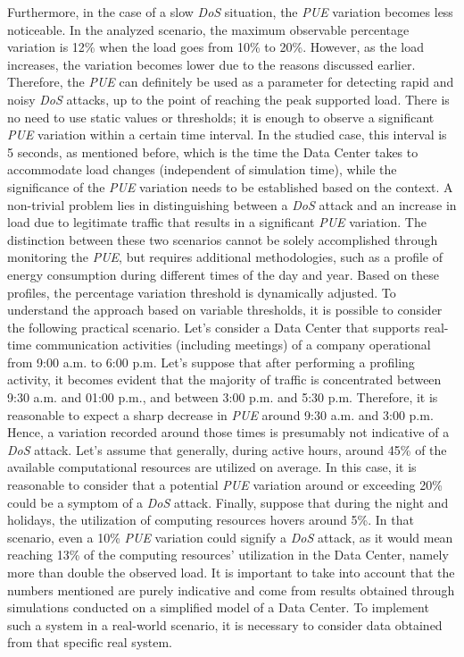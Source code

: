 Furthermore, in the case of a slow \emph{DoS} situation, the \emph{PUE} variation becomes less noticeable. In the analyzed scenario, the maximum observable percentage variation is 12\% when the load goes from 10\% to 20\%. However, as the load increases, the variation becomes lower due to the reasons discussed earlier. Therefore, the \emph{PUE} can definitely be used as a parameter for detecting rapid and noisy \emph{DoS} attacks, up to the point of reaching the peak supported load. There is no need to use static values or thresholds; it is enough to observe a significant \emph{PUE} variation within a certain time interval. In the studied case, this interval is 5 seconds, as mentioned before, which is the time the Data Center takes to accommodate load changes (independent of simulation time), while the significance of the \emph{PUE} variation needs to be established based on the context. A non-trivial problem lies in distinguishing between a \emph{DoS} attack and an increase in load due to legitimate traffic that results in a significant \emph{PUE} variation. The distinction between these two scenarios cannot be solely accomplished through monitoring the \emph{PUE}, but requires additional methodologies, such as a profile of energy consumption during different times of the day and year. Based on these profiles, the percentage variation threshold is dynamically adjusted. To understand the approach based on variable thresholds, it is possible to consider the following practical scenario. Let's consider a Data Center that supports real-time communication activities (including meetings) of a company operational from 9:00 a.m. to 6:00 p.m. Let's suppose that after performing a profiling activity, it becomes evident that the majority of traffic is concentrated between 9:30 a.m. and 01:00 p.m., and between 3:00 p.m. and 5:30 p.m. Therefore, it is reasonable to expect a sharp decrease in \emph{PUE} around 9:30 a.m. and 3:00 p.m. Hence, a variation recorded around those times is presumably not indicative of a \emph{DoS} attack. Let's assume that generally, during active hours, around 45\% of the available computational resources are utilized on average. In this case, it is reasonable to consider that a potential \emph{PUE} variation around or exceeding 20\% could be a symptom of a \emph{DoS} attack. Finally, suppose that during the night and holidays, the utilization of computing resources hovers around 5\%. In that scenario, even a 10\% \emph{PUE} variation could signify a \emph{DoS} attack, as it would mean reaching 13\% of the computing resources' utilization in the Data Center, namely more than double the observed load. It is important to take into account that the numbers mentioned are purely indicative and come from results obtained through simulations conducted on a simplified model of a Data Center. To implement such a system in a real-world scenario, it is necessary to consider data obtained from that specific real system.

